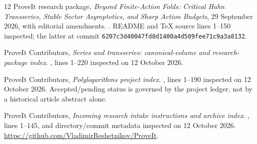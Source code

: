 \documentclass[11pt,a4paper]{article}
\theoremstyle{definition}\newtheorem{definition}[theorem]{Definition}
\theoremstyle{remark}\newtheorem{remark}[theorem]{Remark}
\numberwithin{equation}{section}
\begin{document}
\begin{thebibliography}{12}
ProveIt research package,
\emph{Beyond Finite-Action Folds: Critical Hahn Transseries, Stable Sector
Asymptotics, and Sharp Action Budgets}, 29 September 2026, with editorial
amendments.
.
README and TeX source lines 1--150 inspected; the latter at commit
\texttt{6207c3d40047fd8d1400a4d509fee71c9a3a8132}.

ProveIt Contributors,
\emph{Series and transseries: canonical-volume and research-package index}.
,
lines 1--220 inspected on 12 October 2026.

ProveIt Contributors,
\emph{Polylogarithms project index}.
, lines 1--190 inspected on
12 October 2026. Accepted/pending status is governed by the project ledger,
not by a historical article abstract alone.

ProveIt Contributors,
\emph{Incoming research intake instructions and archive index}.
, lines 1--145, and directory/commit metadata
inspected on 12 October 2026.
\url{https://github.com/VladimirReshetnikov/ProveIt}.
\end{thebibliography}
\endgroup
\end{document}
